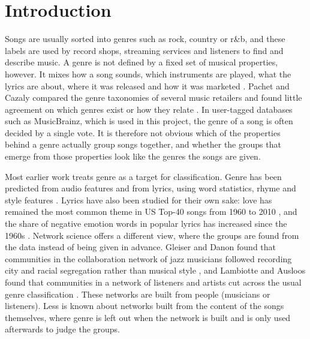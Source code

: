 \section*{Introduction}

Songs are usually sorted into genres such as rock, country or r\&b, and these labels are used by record shops, streaming services and listeners to find and describe music. A genre is not defined by a fixed set of musical properties, however. It mixes how a song sounds, which instruments are played, what the lyrics are about, where it was released and how it was marketed \cite{TODO_aucouturier2003genre, TODO_mckay2006genre}. Pachet and Cazaly compared the genre taxonomies of several music retailers and found little agreement on which genres exist or how they relate \cite{TODO_pachet2000taxonomy}. In user-tagged databases such as MusicBrainz, which is used in this project, the genre of a song is often decided by a single vote. It is therefore not obvious which of the properties behind a genre actually group songs together, and whether the groups that emerge from those properties look like the genres the songs are given.

Most earlier work treats genre as a target for classification. Genre has been predicted from audio features \cite{TODO_tzanetakis2002genre} and from lyrics, using word statistics, rhyme and style features \cite{TODO_mayer2008lyrics, TODO_fell2014lyrics}. Lyrics have also been studied for their own sake: love has remained the most common theme in US Top-40 songs from 1960 to 2010 \cite{TODO_christenson2019themes}, and the share of negative emotion words in popular lyrics has increased since the 1960s \cite{TODO_brand2019emotion}. Network science offers a different view, where the groups are found from the data instead of being given in advance. Gleiser and Danon found that communities in the collaboration network of jazz musicians followed recording city and racial segregation rather than musical style \cite{TODO_gleiser2003jazz}, and Lambiotte and Ausloos found that communities in a network of listeners and artists cut across the usual genre classification \cite{TODO_lambiotte2005listening}. These networks are built from people (musicians or listeners). Less is known about networks built from the content of the songs themselves, where genre is left out when the network is built and is only used afterwards to judge the groups.

